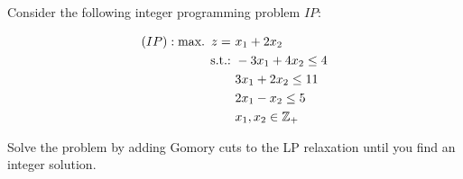 Consider the following integer programming problem $IP$:

\begin{align*}
	(IP) : \mathop{\text{max.~}} z =~& x_1 + 2x_2   \\
	\mathop{\text{s.t.:~}} & -3x_1 + 4x_2 \le 4 \\
		& 3x_1 + 2x_2 \le 11 \\
		& 2x_1 - x_2 \le 5   \\
		& x_1, x_2 \in \mathbb{Z}_+
\end{align*}

Solve the problem by adding Gomory cuts to the LP relaxation until you find an integer solution.